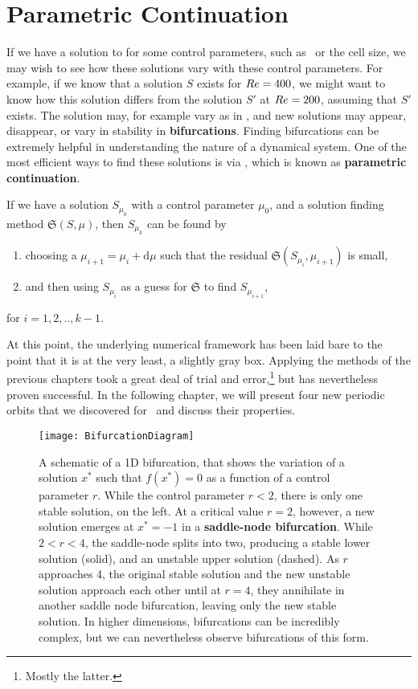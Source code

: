  \section{Parametric Continuation} 
 
 If we have a solution to  for some control parameters, such as \ReN\ or the cell size, we may wish to see how these solutions vary with these control parameters. For example, if we know that a solution $S$  exists for $Re = 400$, we might want to know how this solution differs from the solution $S'$ at $Re = 200$, assuming that $S'$ exists. The solution may, for example vary as in , and new solutions may appear, disappear, or vary in stability in {\bf bifurcations}. Finding bifurcations can be extremely helpful in understanding the nature of a dynamical system. One of the most efficient ways to find these solutions is via , which is known as {\bf parametric continuation}.
 \begin{algorithm}\label{alg:parCont}
 If we have a solution $S_{\mu_0}$ with a control parameter $\mu_0$,  and a solution finding method $\mathfrak{S}(S,\mu)$, then $S_{\mu_k}$ can be found by
 \begin{enumerate}
 \item choosing a $\mu_{i+1} = \mu_{i} + \mathrm{d}\mu$ such that the residual $\mathfrak{S}(S_{\mu_{i}},\mu_{i+1})$ is small,
 \item and then using $S_{\mu_i}$ as a guess for $\mathfrak{S}$ to find $S_{\mu_{i+1}}$,
 \end{enumerate}
 for $i = 1,2,..,k-1$.
 \end{algorithm}
\par
At this point, the underlying numerical framework has been laid bare to the point that it is at the very least, a slightly gray box. Applying the methods of the previous chapters took a great deal of trial and error,\footnote{Mostly the latter.} but has nevertheless proven successful. In the following chapter, we  will present four new periodic orbits that we discovered for \pCf\, and discuss their properties.   
 \begin{figure}[h]
 \centerline{\texttt{[image: BifurcationDiagram]}}
 \caption[A schematic of a 1D bifurcation that shows the variation of a solution $x^*$ such that $f(x^*) = 0$ as a function of a control parameter $r$.]{A schematic of a 1D bifurcation, that shows the variation of a solution $x^*$ such that $f(x^*) = 0$ as a function of a control parameter $r$. While the control parameter $r < 2$, there is only one stable solution, on the left. At a critical value $r = 2$, however, a new solution emerges at $x^* = -1$ in a {\bf saddle-node bifurcation}. While $2 < r < 4$, the saddle-node splits into two, producing a stable lower solution (solid), and an unstable upper solution (dashed). As $r$ approaches 4, the original stable solution and the new unstable solution approach each other until at $r= 4$, they annihilate in another saddle node bifurcation, leaving only the new stable solution. In higher dimensions, bifurcations can be incredibly complex, but we can nevertheless observe bifurcations of this form. }\label{fig:bifurcations}
 \end{figure}
 
 